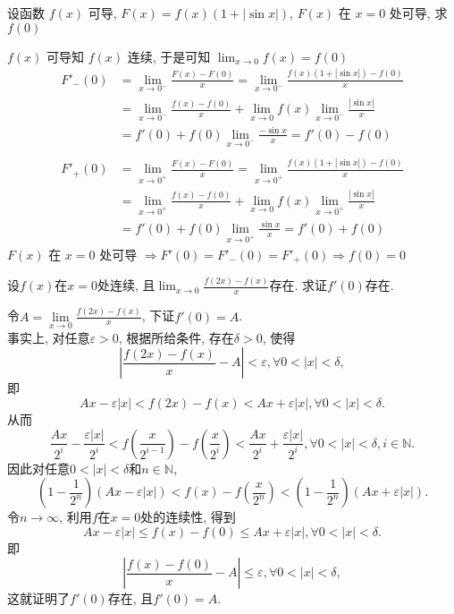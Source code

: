 \documentclass[color=green,titlestyle=hang]{elegantbook}%
\begin{document}
\begin{example}
设函数 $f(x)$ 可导, $F(x)=f(x)(1+|\sin x|)$, $F(x)$ 在 $x=0$ 处可导, 求 $f(0)$
\end{example}\begin{Solution}
$f(x)$ 可导知 $f(x)$ 连续, 于是可知 $\lim_{x\to0}f(x)=f(0)$ 
\begin{align*}
F'_{-}(0)&=\lim_{x\to0^-}\frac{F(x)-F(0)}{x}=\lim_{x\to0^-}\frac{f(x)(1+|\sin x|)-f(0)}{x}\\
&=\lim_{x\to0^-}\frac{f(x)-f(0)}{x}+\lim_{x\to0}f(x)\lim_{x\to0^-}\frac{|\sin x|}{x}\\
&=f'(0)+f(0)\lim_{x\to0^-}\frac{-\sin x}{x}=f'(0)-f(0)\\[-3em]
\end{align*}\begin{align*}
F'_{+}(0)&=\lim_{x\to0^+}\frac{F(x)-F(0)}{x}=\lim_{x\to0^+}\frac{f(x)(1+|\sin x|)-f(0)}{x}\\
&=\lim_{x\to0^+}\frac{f(x)-f(0)}{x}+\lim_{x\to0}f(x)\lim_{x\to0^+}\frac{|\sin x|}{x}\\
&=f'(0)+f(0)\lim_{x\to0^+}\frac{\sin x}{x}=f'(0)+f(0)
\end{align*}
$F(x)$ 在 $x=0$ 处可导 $\Longrightarrow F'(0)=F'_{-}(0)=F'_{+}(0)\Longrightarrow f(0)=0$
\end{Solution}

\begin{exercise}
设$f(x)$在$x=0$处连续, 且$\displaystyle\lim_{x\to 0} \frac{f(2x)-f(x)}{x}$存在. 求证$f'(0)$存在.	
\end{exercise}\begin{solution}
令$A=\lim\limits_{x\to 0}\frac{f(2x)-f(x)}{x}$, 下证$f'(0)=A$. \\
事实上, 对任意$\varepsilon>0$, 根据所给条件, 存在$\delta>0$, 使得
\[\left|\frac{f(2x)-f(x)}{x}-A\right|<\varepsilon, \forall 0<|x|<\delta,\]
即
\[Ax-\varepsilon |x|<f(2x)-f(x)<Ax+\varepsilon|x|,\forall 0<|x|<\delta.\]
从而
\[\frac{Ax}{2^i}- \frac{\varepsilon|x|}{2^i}<f\left(\frac{x}{2^{i-1}}\right)-f\left(\frac{x}{2^i}\right)<\frac{Ax}{2^i}+ \frac{\varepsilon|x|}{2^i},\forall
0<|x|<\delta,i\in\mathbb N.\]
因此对任意$0<|x|<\delta$和$n\in\mathbb N$,
\[\left(1-\frac{1}{2^n}\right)(Ax-\varepsilon |x|)<f(x)-f\left(\frac{x}{2^n}\right)<\left(1-\frac{1}{2^n}\right)(Ax+\varepsilon |x|).
\]
令$n\to\infty$, 利用$f$在$x=0$处的连续性, 得到
\[Ax-\varepsilon |x|\leqslant f(x)-f(0)\leqslant Ax+\varepsilon |x|,\forall 0<|x|<\delta.
\]
即
\[\left|\frac{f(x)-f(0)}{x}-A\right|\leqslant \varepsilon,\forall 0<|x|<\delta,\]
这就证明了$f'(0)$存在, 且$f'(0)=A$.	
\end{solution}
\end{document}
